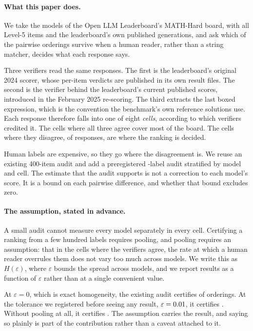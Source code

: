 \paragraph{What this paper does.}
We take the \NumModels{} models of the Open LLM Leaderboard's MATH-Hard board, with all
\NumItems{} Level-5 items and the leaderboard's own published generations, and ask which of
the \NumOrderings{} pairwise orderings survive when a human reader, rather than a string
matcher, decides what each response says.

Three verifiers read the same responses. The first is the leaderboard's original 2024 scorer,
whose per-item verdicts are published in its own result files. The second is the verifier
behind the leaderboard's current published scores, introduced in the February 2025 re-scoring.
The third extracts the last boxed expression, which is the convention the benchmark's own
reference solutions use. Each response therefore falls into one of eight \emph{cells},
according to which verifiers credited it. The cells where all three agree cover most of the
board. The cells where they disagree, \RowsAnyDisagree{} of \NumRows{} responses, are where
the ranking is decided.

Human labels are expensive, so they go where the disagreement is. We reuse an existing
400-item audit and add a preregistered \AuditBudget{}-label audit stratified by model and
cell. The estimate that the audit supports is not a correction to each model's score. It is a
bound on each pairwise difference, and whether that bound excludes zero.

\paragraph{The assumption, stated in advance.}
A small audit cannot measure every model separately in every cell. Certifying a ranking from
a few hundred labels requires pooling, and pooling requires an assumption: that in the cells
where the verifiers agree, the rate at which a human reader overrules them does not vary too
much across models. We write this as $H(\varepsilon)$, where $\varepsilon$ bounds the spread
across models, and we report results as a function of $\varepsilon$ rather than at a single
convenient value.

At $\varepsilon = 0$, which is exact homogeneity, the existing audit certifies \CertEpsZero{}
of \NumOrderings{} orderings. At the tolerance we registered before seeing any result,
$\varepsilon = 0.01$, it certifies \CertPrereg{}. Without pooling at all, it certifies
\CertNoPooling{}. The assumption carries the result, and saying so plainly is part of the
contribution rather than a caveat attached to it.

